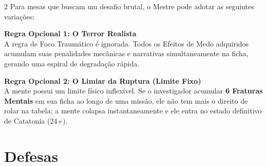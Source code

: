 \documentclass[a4paper,11pt,openany]{book}
\begin{document}
\begin{multicols}{2}
Para mesas que buscam um desafio brutal, o Mestre pode adotar as seguintes variações:

\begin{regra}
\textbf{Regra Opcional 1: O Terror Realista} \\
A regra de Foco Traumático é ignorada. Todos os Efeitos de Medo adquiridos acumulam suas penalidades mecânicas e narrativas simultaneamente na ficha, gerando uma espiral de degradação rápida.
\end{regra}

\begin{regra}
\textbf{Regra Opcional 2: O Limiar da Ruptura (Limite Fixo)} \\
A mente possui um limite físico inflexível. Se o investigador acumular \textbf{6 Fraturas Mentais} em sua ficha ao longo de uma missão, ele não tem mais o direito de rolar na tabela; a mente colapsa instantaneamente e ele entra no estado definitivo de Catatonia (24+).
\end{regra}

\end{multicols}


\chapter{Defesas}
\end{document}
